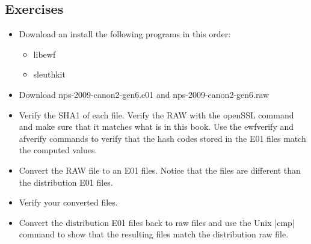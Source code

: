 \subsection{Exercises}
\begin{itemize}
\item Download an install the following programs in this order:
\begin{itemize}
\item   libewf
\item  sleuthkit
\end{itemize}
\item Download nps-2009-canon2-gen6.e01 and nps-2009-canon2-gen6.raw
\item Verify the SHA1 of each file. Verify the RAW with the openSSL
  command and make sure that it matches what is in this book. Use the
  ewfverify and afverify commands to verify that the hash codes stored
  in the E01 files match the computed values.
\item Convert the RAW file to an E01 files. Notice that the
  files are different than the distribution E01 files.
\item Verify your converted files.
\item Convert the distribution E01 files back to raw files and
  use the Unix |cmp| command to show that the resulting files match
  the distribution raw file.
\end{itemize}


